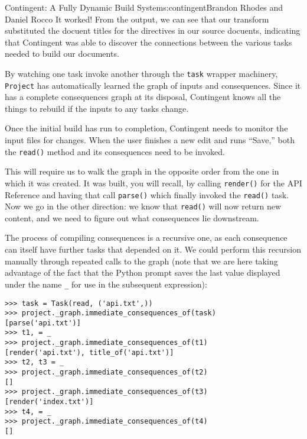 \begin{aosachapter}{Contingent: A Fully Dynamic Build System}{s:contingent}{Brandon Rhodes and Daniel Rocco}
It worked! From the output, we can see that our transform substituted
the docuent titles for the directives in our source docuents, indicating
that Contingent was able to discover the connections between the various
tasks needed to build our documents.


By watching one task invoke another through the \texttt{task} wrapper
machinery, \texttt{Project} has automatically learned the graph of
inputs and consequences. Since it has a complete consequences graph at
its disposal, Contingent knows all the things to rebuild if the inputs
to any tasks change.

\label{chasing-consequences}

Once the initial build has run to completion, Contingent needs to
monitor the input files for changes. When the user finishes a new edit
and runs ``Save,'' both the \texttt{read()} method and its consequences
need to be invoked.

This will require us to walk the graph in the opposite order from the
one in which it was created. It was built, you will recall, by calling
\texttt{render()} for the API Reference and having that call
\texttt{parse()} which finally invoked the \texttt{read()} task. Now we
go in the other direction: we know that \texttt{read()} will now return
new content, and we need to figure out what consequences lie downstream.

The process of compiling consequences is a recursive one, as each
consequence can itself have further tasks that depended on it. We could
perform this recursion manually through repeated calls to the graph
(note that we are here taking advantage of the fact that the Python
prompt saves the last value displayed under the name \texttt{\_} for use
in the subsequent expression):

\begin{verbatim}
>>> task = Task(read, ('api.txt',))
>>> project._graph.immediate_consequences_of(task)
[parse('api.txt')]
>>> t1, = _
>>> project._graph.immediate_consequences_of(t1)
[render('api.txt'), title_of('api.txt')]
>>> t2, t3 = _
>>> project._graph.immediate_consequences_of(t2)
[]
>>> project._graph.immediate_consequences_of(t3)
[render('index.txt')]
>>> t4, = _
>>> project._graph.immediate_consequences_of(t4)
[]
\end{verbatim}


\end{aosachapter}
